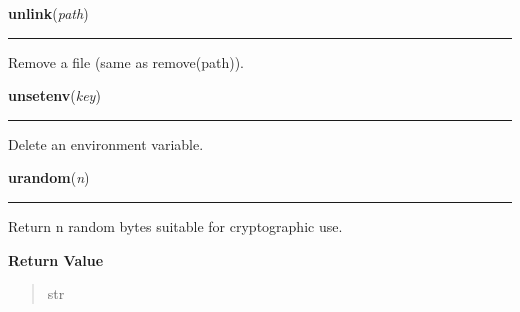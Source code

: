 \hspace{.8\funcindent}\begin{boxedminipage}{\funcwidth}

    \raggedright \textbf{unlink}(\textit{path})

    \vspace{-1.5ex}

    \rule{\textwidth}{0.5\fboxrule}
\setlength{\parskip}{2ex}
    Remove a file (same as remove(path)).

\setlength{\parskip}{1ex}
    \end{boxedminipage}

    \label{os:unsetenv}

    \vspace{0.5ex}

\hspace{.8\funcindent}\begin{boxedminipage}{\funcwidth}

    \raggedright \textbf{unsetenv}(\textit{key})

    \vspace{-1.5ex}

    \rule{\textwidth}{0.5\fboxrule}
\setlength{\parskip}{2ex}
    Delete an environment variable.

\setlength{\parskip}{1ex}
    \end{boxedminipage}

    \label{os:urandom}

    \vspace{0.5ex}

\hspace{.8\funcindent}\begin{boxedminipage}{\funcwidth}

    \raggedright \textbf{urandom}(\textit{n})

    \vspace{-1.5ex}

    \rule{\textwidth}{0.5\fboxrule}
\setlength{\parskip}{2ex}
    Return n random bytes suitable for cryptographic use.

\setlength{\parskip}{1ex}
      \textbf{Return Value}
    \vspace{-1ex}

      \begin{quote}
      str

      \end{quote}

    \end{boxedminipage}

